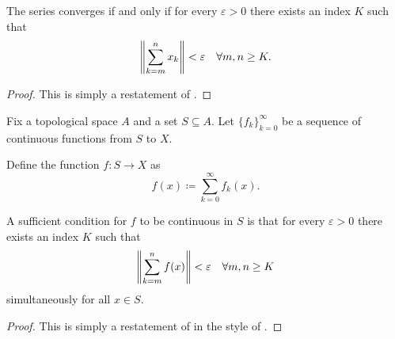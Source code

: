 \begin{proposition}\label{thm:cauchy_series_convergence_criterion}\cite[3.22]{Rudin1976}
  The series  converges if and only if for every \( \varepsilon > 0 \) there exists an index \( K \) such that
  \begin{equation*}
    \left\Vert \sum_{k=m}^n x_k \right\Vert < \varepsilon \quad\forall m, n \geq K.
  \end{equation*}
\end{proposition}
\begin{proof}
  This is simply a restatement of .
\end{proof}

\begin{proposition}\label{thm:cauchy_series_continuity_criterion}\cite[]{Фихтенгольц1968/2}
  Fix a topological space \( A \) and a set \( S \subseteq A \). Let \( \{ f_k \}_{k=0}^\infty \) be a sequence of continuous functions from \( S \) to \( X \).

  Define the function \( f: S \to X \) as
  \begin{equation}\label{thm:cauchy_series_continuity_criterion/function}
    f(x) \coloneqq \sum_{k=0}^\infty f_k(x).
  \end{equation}

  A sufficient condition for \( f \) to be continuous in \( S \) is that for every \( \varepsilon > 0 \) there exists an index \( K \) such that
  \begin{equation*}
    \left\Vert \sum_{k=m}^n f(x) \right\Vert < \varepsilon \quad\forall m, n \geq K
  \end{equation*}
  simultaneously for all \( x \in S \).
\end{proposition}
\begin{proof}
  This is simply a restatement of  in the style of .
\end{proof}

